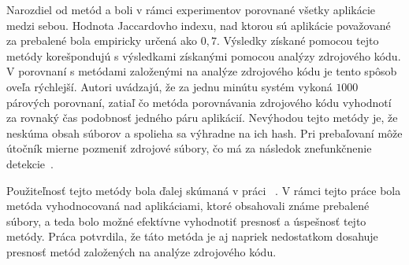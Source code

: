 Narozdiel od metód  a  boli v rámci experimentov porovnané všetky aplikácie medzi sebou. Hodnota Jaccardovho indexu, nad ktorou sú aplikácie považované za prebalené bola empiricky určená ako $0,7$.
Výsledky získané pomocou tejto metódy korešpondujú s výsledkami získanými pomocou analýzy zdrojového kódu. V porovnaní s metódami založenými na analýze zdrojového kódu je tento spôsob oveľa rýchlejší. Autori uvádzajú, že za jednu minútu systém vykoná $1000$ párových porovnaní, zatiaľ čo metóda porovnávania zdrojového kódu vyhodnotí za rovnaký čas podobnosť jedného páru aplikácií.
Nevýhodou tejto metódy je, že neskúma obsah súborov a spolieha sa výhradne na ich hash. Pri prebaľovaní môže útočník mierne pozmeniť zdrojové súbory, čo má za následok znefunkčnenie detekcie~\cite{Zhauniarovich2014}. 

Použiteľnosť tejto metódy bola ďalej skúmaná v práci ~\cite{Gadyatskaya2016}. V rámci tejto práce bola metóda vyhodnocovaná nad aplikáciami, ktoré obsahovali známe prebalené súbory, a teda bolo možné efektívne vyhodnotiť presnosť a úspešnosť tejto metódy. Práca potvrdila, že táto metóda je aj napriek nedostatkom dosahuje presnosť metód založených na analýze zdrojového kódu.